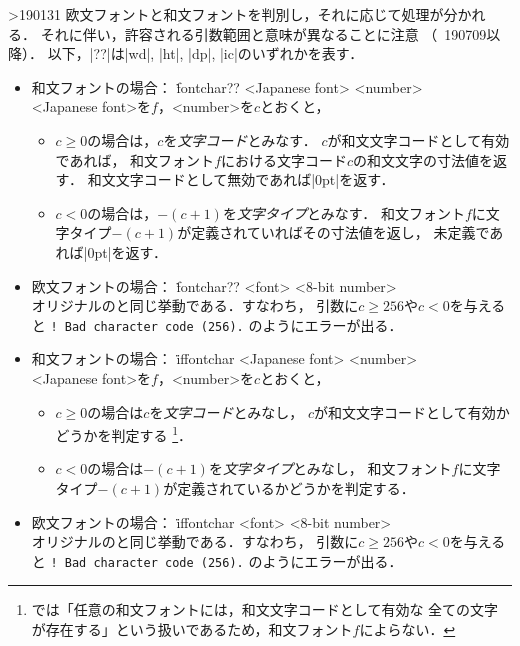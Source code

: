 \documentclass[a4paper,11pt,nomag]{jsarticle}
\begin{document}
\begin{cslist}
\ifnum\epTeXversion>190131 %
  欧文フォントと和文フォントを判別し，それに応じて処理が分かれる．
  それに伴い，許容される引数範囲と意味が異なることに注意
  （\epTeX~190709以降）．
  以下，|??|は|wd|, |ht|, |dp|, |ic|のいずれかを表す．
  \begin{itemize}
    \item 和文フォントの場合： \.{fontchar??} <Japanese font> <number>\\
      <Japanese font>を$f$，<number>を$c$とおくと，
      \begin{itemize}
        \item $c \geq 0$の場合は，$c$を\emph{文字コード}とみなす．
          $c$が和文文字コードとして有効であれば，
          和文フォント$f$における文字コード$c$の和文文字の寸法値を返す．
          和文文字コードとして無効であれば|0pt|を返す．
        \item $c < 0$の場合は，$-(c+1)$を\emph{文字タイプ}とみなす．
          和文フォント$f$に文字タイプ$-(c+1)$が定義されていればその寸法値を返し，
          未定義であれば|0pt|を返す．
      \end{itemize}
    \item 欧文フォントの場合： \.{fontchar??} <font> <8-bit number>\\
      オリジナルの\eTeX と同じ挙動である．すなわち，
      引数に$c \geq 256$や$c < 0$を与えると
      \verb+! Bad character code (256).+
      のようにエラーが出る．
  \end{itemize}

  \begin{itemize}
    \item 和文フォントの場合： \.{iffontchar} <Japanese font> <number>\\
      <Japanese font>を$f$，<number>を$c$とおくと，
      \begin{itemize}
        \item $c \geq 0$の場合は$c$を\emph{文字コード}とみなし，
          $c$が和文文字コードとして有効かどうかを判定する
          \footnote{\pTeX では「任意の和文フォントには，和文文字コードとして有効な
          全ての文字が存在する」という扱いであるため，和文フォント$f$によらない．}．
        \item $c < 0$の場合は$-(c+1)$を\emph{文字タイプ}とみなし，
          和文フォント$f$に文字タイプ$-(c+1)$が定義されているかどうかを判定する．
      \end{itemize}
    \item 欧文フォントの場合： \.{iffontchar} <font> <8-bit number>\\
      オリジナルの\eTeX と同じ挙動である．すなわち，
      引数に$c \geq 256$や$c < 0$を与えると
      \verb+! Bad character code (256).+
      のようにエラーが出る．
  \end{itemize}
\fi %
\end{cslist}
\end{document}
